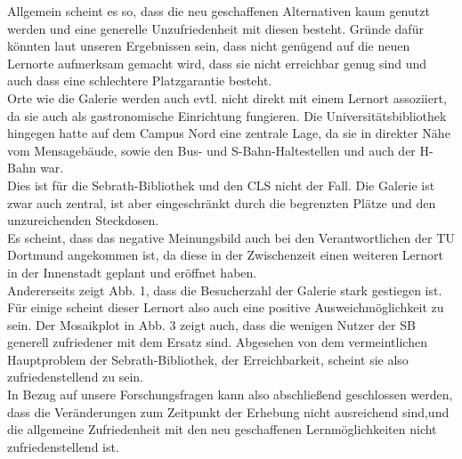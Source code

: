 \documentclass[11pt, a4paper]{article}
\begin{document}
Allgemein scheint es so, dass die neu geschaffenen Alternativen kaum genutzt werden und eine generelle Unzufriedenheit mit diesen besteht. Gründe dafür könnten laut unseren Ergebnissen sein, dass nicht genügend auf die neuen Lernorte aufmerksam gemacht wird, dass sie nicht erreichbar genug sind und auch dass eine schlechtere Platzgarantie besteht.\\
Orte wie die Galerie werden auch evtl. nicht direkt mit einem Lernort assoziiert, da sie auch als gastronomische Einrichtung fungieren. Die Universitätsbibliothek hingegen hatte auf dem Campus Nord eine zentrale Lage, da sie in direkter Nähe vom Mensagebäude, sowie den Bus- und S-Bahn-Haltestellen und auch der H-Bahn war.\\
Dies ist für die Sebrath-Bibliothek und den CLS nicht der Fall. Die Galerie ist zwar auch zentral, ist aber eingeschränkt durch die begrenzten Plätze und den unzureichenden Steckdosen.\\
Es scheint, dass das negative Meinungsbild auch bei den Verantwortlichen der TU Dortmund angekommen ist, da diese in der Zwischenzeit einen weiteren Lernort in der Innenstadt geplant und eröffnet haben.\\
Andererseits zeigt Abb. 1, dass die Besucherzahl der Galerie stark gestiegen ist. 
Für einige scheint dieser Lernort also auch eine positive Ausweichmöglichkeit zu sein.
Der Mosaikplot in Abb. 3 zeigt auch, dass die wenigen Nutzer der SB generell zufriedener mit dem Ersatz sind. Abgesehen von dem vermeintlichen Hauptproblem der Sebrath-Bibliothek, der Erreichbarkeit, scheint sie also zufriedenstellend zu sein.\\
In Bezug auf unsere Forschungsfragen kann also abschließend geschlossen werden, dass die Veränderungen zum Zeitpunkt der Erhebung nicht ausreichend sind,und die allgemeine Zufriedenheit mit den neu geschaffenen Lernmöglichkeiten nicht zufriedenstellend ist.



\newpage
\end{document}
